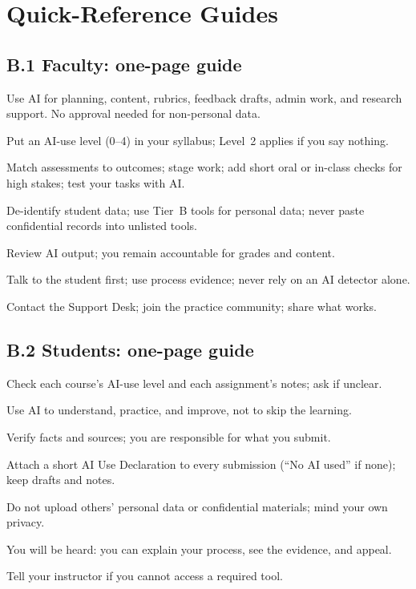 \section{Quick-Reference Guides}\label{app:quickref}

\subsection*{B.1 Faculty: one-page guide}
\begin{description}[leftmargin=0.5cm]
  \item[Go ahead] Use AI for planning, content, rubrics, feedback drafts, admin work, and research support. No approval needed for non-personal data.
  \item[Declare] Put an AI-use level (0--4) in your syllabus; Level~2 applies if you say nothing.
  \item[Design] Match assessments to outcomes; stage work; add short oral or in-class checks for high stakes; test your tasks with AI.
  \item[Protect data] De-identify student data; use Tier~B tools for personal data; never paste confidential records into unlisted tools.
  \item[Own the result] Review AI output; you remain accountable for grades and content.
  \item[Handle concerns] Talk to the student first; use process evidence; never rely on an AI detector alone.
  \item[Get help] Contact the Support Desk; join the practice community; share what works.
\end{description}

\subsection*{B.2 Students: one-page guide}
\begin{description}[leftmargin=0.5cm]
  \item[Read] Check each course's AI-use level and each assignment's notes; ask if unclear.
  \item[Use to learn] Use AI to understand, practice, and improve, not to skip the learning.
  \item[Check] Verify facts and sources; you are responsible for what you submit.
  \item[Disclose] Attach a short AI Use Declaration to every submission (``No AI used'' if none); keep drafts and notes.
  \item[Protect] Do not upload others' personal data or confidential materials; mind your own privacy.
  \item[If accused] You will be heard: you can explain your process, see the evidence, and appeal.
  \item[Need access?] Tell your instructor if you cannot access a required tool.
\end{description}

